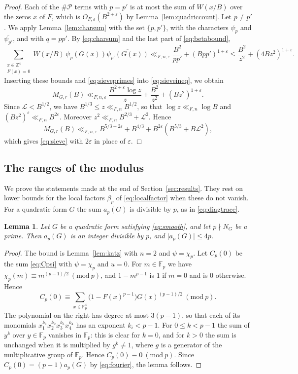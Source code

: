 \documentclass[11pt]{amsart}
\numberwithin{equation}{section}
\numberwithin{figure}{section}
\newtheorem{lemma}{Lemma}[section]
\theoremstyle{definition}
\newcommand{\Z}{\mathbb{Z}}
\newcommand{\F}{\mathcal{F}}
\newcommand{\imod}[1]{\ (\mathrm{mod}\ #1)}
\newcommand{\eps}{\varepsilon}
\newcommand{\abs}[1]{\lvert #1\rvert}
\newcommand{\Fp}{\mathbb F_p}
\begin{document}
\begin{proof}
Each of the $\#\mathcal P$ terms with $p=p'$ is at most the sum of
$W(x/B)$ over the zeros $x$ of $F$, which is
$O_{F,\eps}(B^{2+\eps})$ by Lemma~\ref{lem:quadriccount}. Let $p\ne p'$. We apply
Lemma~\ref{lem:charsum} with the set $\{p,p'\}$, with the characters
$\psi_p$ and $\overline{\psi_{p'}}$, and with $q=pp'$. By
\eqref{eq:charsum} and the last part of \eqref{eq:betabound},
\[
 \sum_{\substack{x\in\Z^4\\F(x)=0}}W(x/B)\,
 \psi_p(G(x))\overline{\psi_{p'}(G(x))}
 \ll_{F,n,\eps}\frac{B^2}{pp'}+(Bpp')^{1+\eps}
 \le\frac{B^2}{z^2}+(4Bz^2)^{1+\eps}.
\]
Inserting these bounds and \eqref{eq:sieveprimes} into
\eqref{eq:sieveineq}, we obtain
\[
 M_{G,r}(B)\ll_{F,n,\eps}\frac{B^{2+\eps}\log z}z
 +\frac{B^2}{z^2}+(Bz^2)^{1+\eps}.
\]
Since $\mathcal L<B^{1/2}$, we have $B^{1/3}\le z\ll_{F,n}B^{1/2}$,
so that $\log z\ll_{F,n}\log B$ and
$(Bz^2)^\eps\ll_{F,n}B^{2\eps}$. Moreover
$z^2\ll_{F,n}B^{2/3}+\mathcal L^2$. Hence
\[
 M_{G,r}(B)\ll_{F,n,\eps}B^{5/3+2\eps}+B^{4/3}
 +B^{2\eps}(B^{5/3}+B\mathcal L^2),
\]
which gives \eqref{eq:sieve} with $2\eps$ in place of $\eps$.
\end{proof}

\subsection{The ranges of the modulus}\label{sec:relative}

We prove the statements made at the end of
Section~\ref{sec:results}. They rest on lower bounds for the local
factors $\beta_p$ of \eqref{eq:localfactor} when these do not vanish.
For a quadratic form $G$ the sum $a_p(G)$ is divisible by $p$, as in
\eqref{eq:diagtrace}.

\begin{lemma}\label{lem:divisible}
Let $G$ be a quadratic form satisfying \eqref{eq:smooth}, and let
$p\nmid N_G$ be a prime. Then $a_p(G)$ is an integer divisible by
$p$, and $\abs{a_p(G)}\le4p$.
\end{lemma}

\begin{proof}
The bound is Lemma~\ref{lem:katz} with $n=2$ and $\psi=\chi_p$. Let
$C_p(0)$ be the sum \eqref{eq:Cpsi} with $\psi=\chi_p$ and $u=0$. For
$m\in\Fp$ we have $\chi_p(m)\equiv m^{(p-1)/2}\imod p$, and
$1-m^{p-1}$ is $1$ if $m=0$ and is $0$ otherwise. Hence
\[
 C_p(0)\equiv\sum_{x\in\Fp^4}\big(1-F(x)^{p-1}\big)G(x)^{(p-1)/2}\imod p.
\]
The polynomial on the right has degree at most $3(p-1)$, so that each
of its monomials $x_1^{k_1}x_2^{k_2}x_3^{k_3}x_4^{k_4}$ has an
exponent $k_i<p-1$. For $0\le k<p-1$ the sum of $y^k$ over
$y\in\Fp$ vanishes in $\Fp$: this is clear for $k=0$, and for $k>0$
the sum is unchanged when it is multiplied by $g^k\ne1$, where $g$ is
a generator of the multiplicative group of $\Fp$. Hence
$C_p(0)\equiv0\imod p$. Since $C_p(0)=(p-1)a_p(G)$ by
\eqref{eq:fourier}, the lemma follows.
\end{proof}
\end{document}
